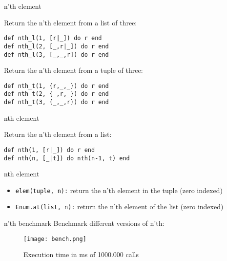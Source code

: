 \begin{frame}[fragile]{n'th element}

Return the n'th element from a list of three:

\pause 
\begin{verbatim}
def nth_l(1, [r|_]) do r end
def nth_l(2, [_,r|_]) do r end
def nth_l(3, [_,_,r]) do r end
\end{verbatim}

\pause Return the n'th element from a tuple of three:
\pause

\begin{verbatim}
def nth_t(1, {r,_,_}) do r end
def nth_t(2, {_,r,_}) do r end
def nth_t(3, {_,_,r}) do r end
\end{verbatim}

\end{frame}

\begin{frame}[fragile]{nth element}

Return the n'th element from a list:

\pause 
\begin{verbatim}
def nth(1, [r|_]) do r end
def nth(n, [_|t]) do nth(n-1, t) end
\end{verbatim}

\end{frame}


\begin{frame}{nth element}

\begin{itemize}
  \item {\tt elem(tuple, n):} return the n'th element in the tuple (zero indexed)
  \item {\tt Enum.at(list, n):} return the n'th element of the list (zero indexed)
\end{itemize}

\end{frame}

\begin{frame}{n'th benchmark}
Benchmark different versions of n'th:
 \begin{figure}
  \centering
  \texttt{[image: bench.png]}
  \caption{Execution time in ms of 1000.000 calls}
 \end{figure}

\end{frame}

